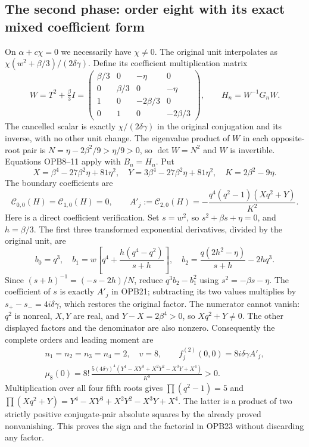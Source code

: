 \subsection{The second phase: order eight with its exact mixed coefficient form}
On $\alpha+c\chi=0$ we necessarily have $\chi\ne0$. The original
unit interpolates as $\chi(w^2+\beta/3)/(2\delta\gamma)$.
Define its coefficient multiplication matrix
\[
 W=T^2+\tfrac\beta3 I=
 \begin{pmatrix}
 \beta/3&0&-\eta&0\\0&\beta/3&0&-\eta\\
 1&0&-2\beta/3&0\\0&1&0&-2\beta/3
 \end{pmatrix},\qquad H_n=W^{-1}G_nW.
 \tag{OPB19}
\]
The cancelled scalar is exactly $\chi/(2\delta\gamma)$ in the
original conjugation and its inverse, with no other unit change.
The eigenvalue product of $W$ in each opposite-root pair is
$N=\eta-2\beta^2/9>\eta/9>0$, so $\det W=N^2$ and $W$ is
invertible. Equations OPB8--11 apply with $B_n=H_n$.
Put
\[
 X=\beta^4-27\beta^2\eta+81\eta^2,\quad
 Y=3\beta^4-27\beta^2\eta+81\eta^2,\quad
 K=2\beta^2-9\eta.
 \tag{OPB20}
\]
The boundary coefficients are
\[
 \mathcal C_{0,0}(H)=\mathcal C_{1,0}(H)=0,\qquad
 A'_j:=\mathcal C_{2,0}(H)
 =-\frac{q^4(q^2-1)(Xq^2+Y)}{K^2}.
 \tag{OPB21}
\]
Here is a direct coefficient verification. Set $s=w^2$, so
$s^2+\beta s+\eta=0$, and $h=\beta/3$. The first three
transformed exponential derivatives, divided by the original unit, are
\[
 b_0=q^3,\quad
 b_1=w\left[q^4+\frac{h(q^4-q^2)}{s+h}\right],\quad
 b_2=\frac{q(2h^2-\eta)}{s+h}-2hq^3.
 \tag{OPB22}
\]
Since $(s+h)^{-1}=(-s-2h)/N$, reduce
$q^3b_2-b_1^2$ using $s^2=-\beta s-\eta$.
The coefficient of $s$ is exactly $A'_j$ in OPB21; subtracting its
two values multiplies by $s_+-s_-=4i\delta\gamma$, which restores
the original factor. The numerator cannot vanish: $q^2$ is nonreal,
$X,Y$ are real, and $Y-X=2\beta^4>0$, so $Xq^2+Y\ne0$.
The other displayed factors and the denominator are also nonzero.
Consequently the complete orders and leading moment are
\[
 \begin{gathered}
 n_1=n_2=n_3=n_4=2,\quad v=8,\qquad
 f_j^{(2)}(0,0)=8i\delta\gamma A'_j,\\
 \boxed{\mu_8(0)=8!\,
 \frac{5(4\delta\gamma)^4
 (Y^4-XY^3+X^2Y^2-X^3Y+X^4)}{K^8}>0.}
 \end{gathered}\tag{OPB23}
\]
Multiplication over all four fifth roots gives
$\prod(q^2-1)=5$ and
$\prod(Xq^2+Y)=Y^4-XY^3+X^2Y^2-X^3Y+X^4$.
The latter is a product of two strictly positive conjugate-pair
absolute squares by the already proved nonvanishing. This proves the
sign and the factorial in OPB23 without discarding any factor.

